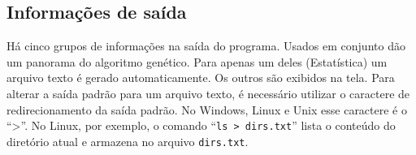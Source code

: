 \subsection{Informações de saída}
		
Há cinco grupos de informações na saída do programa. Usados em conjunto dão um panorama do algoritmo genético. Para apenas um deles (Estatística) um arquivo texto é gerado automaticamente. Os outros são exibidos na tela. Para alterar a saída padrão para um arquivo texto, é necessário utilizar o caractere de redirecionamento da saída padrão. No Windows, Linux e Unix esse caractere é o ``>''. No Linux, por exemplo, o comando ``\texttt{ls > dirs.txt}'' lista o conteúdo do diretório atual e armazena no arquivo \texttt{dirs.txt}.


